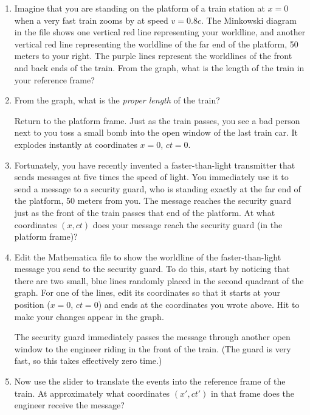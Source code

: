 \begin{enumerate}[wide]
\item Imagine that you are standing on the platform of a train station at $x=0$  when a
very fast train zooms by at speed $v=0.8c$.  The Minkowski diagram in the file shows one vertical red line representing your worldline, and another vertical red line representing the worldline of the far end of the platform, 50 meters to your right.  The purple lines represent the worldlines of the front and back ends of the train. From the graph, what is the length of the train in your reference frame?
\answerspace{0.7in}

\item From the graph, what is the \textit{proper length} of the train?
\answerspace{0.7in}

Return to the platform frame.  Just as the train passes, you see a bad person next to you toss a small bomb into the open window of the last train car. It explodes instantly at coordinates $x = 0$, $ct = 0$.

\item Fortunately, you have recently invented a faster-than-light transmitter that sends messages at five times the speed of light. You immediately use it to send a message to a security guard, who is standing exactly at the far end of the platform, 50 meters from you.  The message reaches the security guard just as the front of the train passes that end of the platform. At what coordinates $(x,ct)$ does your message reach the security guard (in the platform frame)?
\answerspace{0.7in}

\item Edit the Mathematica file to show the worldline of the faster-than-light message you send to the security guard.  To do this, start by noticing that there are two small, blue lines randomly placed in the second quadrant of the graph.  For one of the lines, edit its coordinates so that it starts at your position ($x=0$, $ct=0$) and ends at the coordinates you wrote above.  Hit  to make your changes appear in the graph.

The security guard immediately passes the message through another open window to the engineer riding in the front of the train. (The guard is very fast, so this takes effectively zero time.)

\item Now use the slider to translate the events into the reference frame of the train. At approximately what coordinates 
$(x', ct')$ in that frame does the engineer receive the message?
\answerspace{0.7in}


\end{enumerate}
